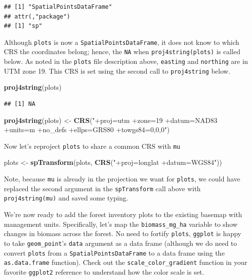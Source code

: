 \documentclass[
]{krantz}
\newenvironment{Shaded}{\begin{snugshade}}{\end{snugshade}}
\newcommand{\KeywordTok}[1]{\textcolor[rgb]{0.13,0.29,0.53}{\textbf{#1}}}
\newcommand{\NormalTok}[1]{#1}
\newcommand{\StringTok}[1]{\textcolor[rgb]{0.31,0.60,0.02}{#1}}
\begin{document}
\begin{verbatim}
## [1] "SpatialPointsDataFrame"
## attr(,"package")
## [1] "sp"
\end{verbatim}

Although \texttt{plots} is now a \texttt{SpatialPointsDataFrame}, it does not know to which CRS the coordinates belong; hence, the \texttt{NA} when \texttt{proj4string(plots)} is called below. As noted in the \texttt{plots} file description above, \texttt{easting} and \texttt{northing} are in UTM zone 19. This CRS is set using the second call to \texttt{proj4string} below.

\begin{Shaded}
\begin{Highlighting}[]
\KeywordTok{proj4string}\NormalTok{(plots)}
\end{Highlighting}
\end{Shaded}

\begin{verbatim}
## [1] NA
\end{verbatim}

\begin{Shaded}
\begin{Highlighting}[]
\KeywordTok{proj4string}\NormalTok{(plots) \textless{}{-}}\StringTok{ }\KeywordTok{CRS}\NormalTok{(}\StringTok{"+proj=utm +zone=19 +datum=NAD83 +units=m }
\StringTok{                             +no\_defs +ellps=GRS80 +towgs84=0,0,0"}\NormalTok{)                   }
\end{Highlighting}
\end{Shaded}

Now let's reproject \texttt{plots} to share a common CRS with \texttt{mu}

\begin{Shaded}
\begin{Highlighting}[]
\NormalTok{plots \textless{}{-}}\StringTok{ }\KeywordTok{spTransform}\NormalTok{(plots, }\KeywordTok{CRS}\NormalTok{(}\StringTok{"+proj=longlat +datum=WGS84"}\NormalTok{))}
\end{Highlighting}
\end{Shaded}

Note, because \texttt{mu} is already in the projection we want for \texttt{plots}, we could have replaced the second argument in the \texttt{spTransform} call above with \texttt{proj4string(mu)} and saved some typing.

We're now ready to add the forest inventory plots to the existing basemap with management units. Specifically, let's map the \texttt{biomass\_mg\_ha} variable to show changes in biomass across the forest. No need to fortify \texttt{plots}, \texttt{ggplot} is happy to take \texttt{geom\_point}'s \texttt{data} argument as a data frame (although we do need to convert \texttt{plots} from a \texttt{SpatialPointsDataFrame} to a data frame using the \texttt{as.data.frame} function). Check out the \texttt{scale\_color\_gradient} function in your favorite \texttt{ggplot2} reference to understand how the color scale is set.
\end{document}
